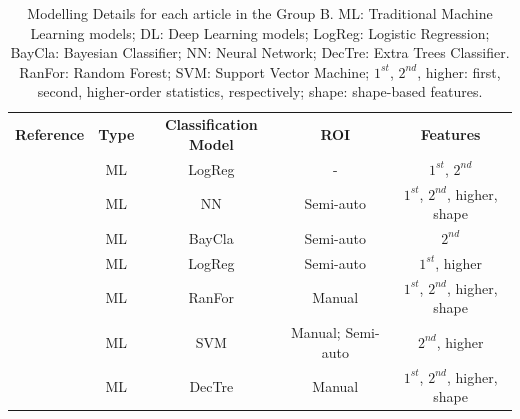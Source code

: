 \documentclass[11pt]{article}
\begin{document}
\begin{table}[]
    \centering
    \begin{tabular}{ccccc}\toprule
        \multirow{2}{*}{\textbf{Reference}} & \multirow{2}{*}{\textbf{Type}} & \multirow{2}{*}{\textbf{Classification Model}} & \multirow{2}{*}{\textbf{ROI}} & \multirow{2}{*}{\textbf{Features}} \\
        \\ \midrule
        \cite{Shoemaker2018}                & ML                             & LogReg                                         & -                             & $1^{st}$, $2^{nd}$                 \\
        \cite{Koyuncu2019}                  & ML                             & NN                                             & Semi-auto                     & $1^{st}$, $2^{nd}$, higher, shape  \\
        \cite{Li2019}                       & ML                             & BayCla                                         & Semi-auto                     & $2^{nd}$                           \\
        \cite{Andersen2021}                 & ML                             & LogReg                                         & Semi-auto                     & $1^{st}$, higher                   \\
        \cite{Moawad2021}                   & ML                             & RanFor                                         & Manual                        & $1^{st}$, $2^{nd}$, higher, shape  \\
        \cite{Barstugan2020}                & ML                             &
        SVM                                 & Manual; Semi-auto
                                            & $2^{nd}$, higher                                                                                                                                     \\
        \cite{Stanzione2021}                & ML                             & DecTre                                         & Manual                        & $1^{st}$, $2^{nd}$, higher, shape  \\
        \bottomrule
    \end{tabular}
    \caption{Modelling Details for each article in the Group B. ML: Traditional Machine Learning models; DL: Deep Learning models; LogReg: Logistic Regression; BayCla: Bayesian Classifier; NN: Neural Network; DecTre: Extra Trees Classifier.
        RanFor: Random Forest; SVM: Support Vector Machine; $1^{st}$, $2^{nd}$, higher: first, second, higher-order statistics, respectively; shape: shape-based features.}
    \label{tab:model_B}
\end{table}
\end{document}
